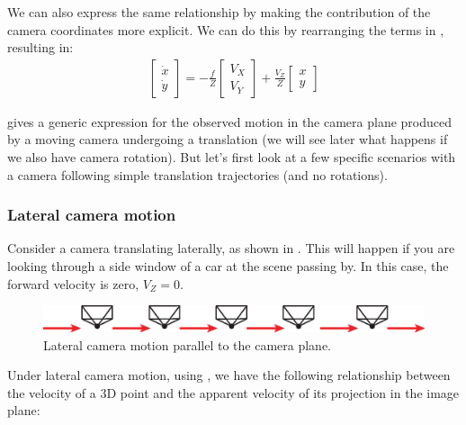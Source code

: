 We can also express the same relationship by making the contribution of the camera coordinates more explicit. We can do this by rearranging the terms in \eqn{\ref{eq:2d_motion_field_equation}}, resulting in:
\begin{align}
\begin{bmatrix}
\dot{x} \\
\dot{y}
\end{bmatrix}
= -\frac{f}{Z}
\begin{bmatrix}
V_X\\
V_Y 
\end{bmatrix}
+
\frac{V_Z}{Z}
\begin{bmatrix}
x\\
y 
\end{bmatrix}
\end{align}

\Eqn{\ref{eq:2d_motion_field_equation}} gives a generic expression for the observed motion in the camera plane produced by a moving camera undergoing a translation (we will see later what happens if we also have camera rotation). But let's first look at a few specific scenarios with a camera following simple translation trajectories (and no rotations).

\subsubsection{Lateral camera motion}
Consider a camera translating laterally, as shown in \fig{\ref{fig:camera_lateral_translation}}. This will happen if you are looking through a side window of a car at the scene passing by. In this case, the forward velocity is zero, $V_Z=0$. 

\begin{figure}
\centerline{
\includegraphics[width=1\linewidth]{figures/optical_flow/camera_lateral_translation.eps}
} 
\caption{Lateral camera motion parallel to the camera plane.}
\label{fig:camera_lateral_translation}
\end{figure}

Under lateral camera motion, using \eqn{\ref{eq:parallelmotion}}, we have the following relationship between the velocity of a 3D point and the apparent velocity of its projection in the image plane:

